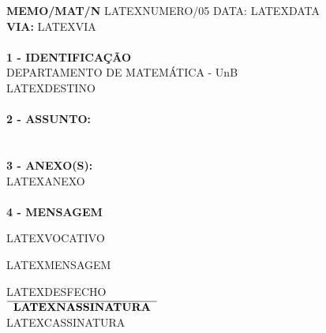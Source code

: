 \documentclass[12pt]{artigo}
\begin{document}
\vspace*{.8cm}
\timbrado
\parindent=2cm 
\setlength{\baselineskip}{5mm}
\noindent 
\begin{minipage}{16cm}
\vspace*{-12mm}
\parindent=2cm
\setlength{\baselineskip}{5mm}
\vspace*{.2cm}
\noindent
\small
{\bf  MEMO/MAT/N\primo} LATEXNUMERO/05 \hfill {DATA:} {LATEXDATA\ }
\vum \\
{\bf VIA:} {LATEXVIA\ }  
\\
\mbox{} \hrulefill\
\\
{\bf 1 - IDENTIFICA\c{C}\~AO} 
\\
\phantom{xxx}{\bf Proced\^encia:} {DEPARTAMENTO DE MATEM\'ATICA - UnB}
\\
 {LATEXDESTINO\ }
\\
\mbox{} \hrulefill\
\\
{\bf 2 - ASSUNTO:} \\
\phantom{xxx}{LATEXASSUNTO\ }
\\
\mbox{} \hrulefill\
\\
{\bf 3 - ANEXO(S):} 
\\
\phantom{xxx} {LATEXANEXO\ }
\\
\mbox{} \hrulefill\
\\
{ \bf 4 - MENSAGEM} 
\end{minipage}
\setlength{\baselineskip}{9mm}
\vspace*{.92cm} 

LATEXVOCATIVO\,
\vspace*{8mm} 

LATEXMENSAGEM
\vspace*{15mm} 
\begin{center} 
\setlength{\baselineskip}{6mm}
LATEXDESFECHO\,
\vspace*{15mm} \\
$\overline{\phantom{x}\mbox{\bf LATEXNASSINATURA} \phantom{x}}$ 
\\
LATEXCASSINATURA
\end{center}
\end{document}
